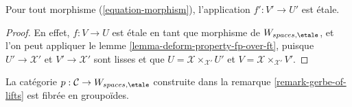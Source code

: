 \begin{lemma}
\label{lemma-morphisms-lifts-etale}
Pour tout morphisme (\ref{equation-morphism}), l'application $f' : V' \to U'$ est \'etale.
\end{lemma}

\begin{proof}
En effet, $f : V \to U$ est \'etale en tant que morphisme de $W_{spaces, \etale}$,
et l'on peut appliquer le
lemme \ref{lemma-deform-property-fp-over-ft}, puisque $U' \to \mathcal{X}'$
et $V' \to \mathcal{X}'$ sont lisses et que
$U = \mathcal{X} \times_{\mathcal{X}'} U'$ et
$V = \mathcal{X} \times_{\mathcal{X}'} V'$.
\end{proof}

\begin{lemma}
\label{lemma-gerbe-of-lifts-fibred}
La catégorie $p : \mathcal{C} \to W_{spaces, \etale}$ construite
dans la remarque \ref{remark-gerbe-of-lifts} est fibrée en groupoïdes.
\end{lemma}

